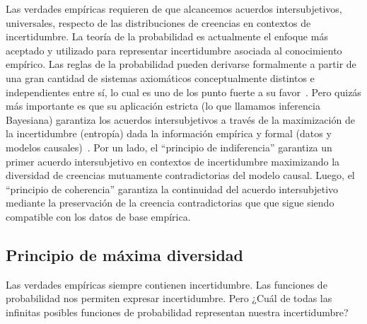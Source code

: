 \documentclass[a4paper,10pt]{book}
\theoremstyle{definition}
\begin{document}
Las verdades empíricas requieren de que alcancemos acuerdos intersubjetivos, universales, respecto de las distribuciones de creencias en contextos de incertidumbre.
La teoría de la probabilidad es actualmente el enfoque más aceptado y utilizado para representar incertidumbre asociada al conocimiento empírico.
Las reglas de la probabilidad pueden derivarse formalmente a partir de una gran cantidad de sistemas axiomáticos conceptualmente distintos e independientes entre sí, lo cual es uno de los punto fuerte a su favor~\cite{halpern2017}.
Pero quizás más importante es que su aplicación estricta (lo que llamamos inferencia Bayesiana) garantiza los acuerdos intersubjetivos a través de la maximización de la incertidumbre (entropía) dada la información empírica y formal (datos y modelos causales)~\cite{Jaynes2003}.
Por un lado, el ``principio de indiferencia'' garantiza un primer acuerdo intersubjetivo en contextos de incertidumbre maximizando la diversidad de creencias mutuamente contradictorias del modelo causal.
Luego, el ``principio de coherencia'' garantiza la continuidad del acuerdo intersubjetivo mediante la preservación de la creencia contradictorias que que sigue siendo compatible con los datos de base empírica.


\subsection{Principio de máxima diversidad} %

Las verdades empíricas siempre contienen incertidumbre.
Las funciones de probabilidad nos permiten expresar incertidumbre.
Pero ¿Cuál de todas las infinitas posibles funciones de probabilidad representan nuestra incertidumbre?
\end{document}
